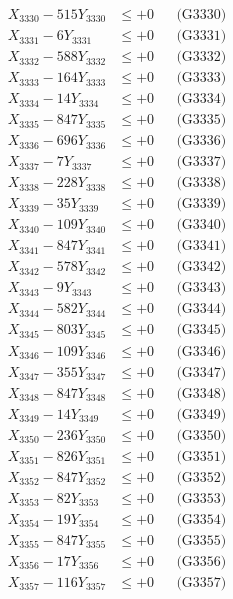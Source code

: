 \documentclass[a4paper,10pt]{article}
\begin{document}
{\begin{align}
X_{3330} - 515Y_{3330} &\leq +0 && \text{(G3330)} \\
\allowbreak
X_{3331} - 6Y_{3331} &\leq +0 && \text{(G3331)} \\
X_{3332} - 588Y_{3332} &\leq +0 && \text{(G3332)} \\
X_{3333} - 164Y_{3333} &\leq +0 && \text{(G3333)} \\
X_{3334} - 14Y_{3334} &\leq +0 && \text{(G3334)} \\
X_{3335} - 847Y_{3335} &\leq +0 && \text{(G3335)} \\
X_{3336} - 696Y_{3336} &\leq +0 && \text{(G3336)} \\
X_{3337} - 7Y_{3337} &\leq +0 && \text{(G3337)} \\
X_{3338} - 228Y_{3338} &\leq +0 && \text{(G3338)} \\
X_{3339} - 35Y_{3339} &\leq +0 && \text{(G3339)} \\
X_{3340} - 109Y_{3340} &\leq +0 && \text{(G3340)} \\
\allowbreak
X_{3341} - 847Y_{3341} &\leq +0 && \text{(G3341)} \\
X_{3342} - 578Y_{3342} &\leq +0 && \text{(G3342)} \\
X_{3343} - 9Y_{3343} &\leq +0 && \text{(G3343)} \\
X_{3344} - 582Y_{3344} &\leq +0 && \text{(G3344)} \\
X_{3345} - 803Y_{3345} &\leq +0 && \text{(G3345)} \\
X_{3346} - 109Y_{3346} &\leq +0 && \text{(G3346)} \\
X_{3347} - 355Y_{3347} &\leq +0 && \text{(G3347)} \\
X_{3348} - 847Y_{3348} &\leq +0 && \text{(G3348)} \\
X_{3349} - 14Y_{3349} &\leq +0 && \text{(G3349)} \\
X_{3350} - 236Y_{3350} &\leq +0 && \text{(G3350)} \\
\allowbreak
X_{3351} - 826Y_{3351} &\leq +0 && \text{(G3351)} \\
X_{3352} - 847Y_{3352} &\leq +0 && \text{(G3352)} \\
X_{3353} - 82Y_{3353} &\leq +0 && \text{(G3353)} \\
X_{3354} - 19Y_{3354} &\leq +0 && \text{(G3354)} \\
X_{3355} - 847Y_{3355} &\leq +0 && \text{(G3355)} \\
X_{3356} - 17Y_{3356} &\leq +0 && \text{(G3356)} \\
X_{3357} - 116Y_{3357} &\leq +0 && \text{(G3357)} \\

\end{align}}
\end{document}
